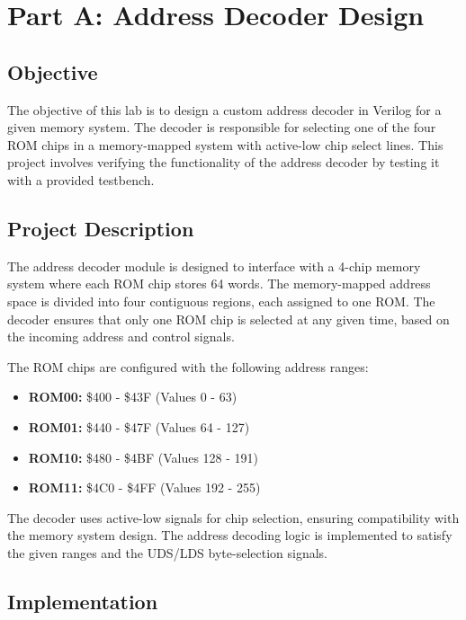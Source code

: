 \section{Part A: Address Decoder Design}

\subsection{Objective}
The objective of this lab is to design a custom address decoder in Verilog for a given memory system. The decoder is responsible for selecting one of the four ROM chips in a memory-mapped system with active-low chip select lines. This project involves verifying the functionality of the address decoder by testing it with a provided testbench.

\subsection{Project Description}
The address decoder module is designed to interface with a 4-chip memory system where each ROM chip stores 64 words. The memory-mapped address space is divided into four contiguous regions, each assigned to one ROM. The decoder ensures that only one ROM chip is selected at any given time, based on the incoming address and control signals.

The ROM chips are configured with the following address ranges:
\begin{itemize}
    \item \textbf{ROM00:} \$400 - \$43F (Values 0 - 63)
    \item \textbf{ROM01:} \$440 - \$47F (Values 64 - 127)
    \item \textbf{ROM10:} \$480 - \$4BF (Values 128 - 191)
    \item \textbf{ROM11:} \$4C0 - \$4FF (Values 192 - 255)
\end{itemize}

The decoder uses active-low signals for chip selection, ensuring compatibility with the memory system design. The address decoding logic is implemented to satisfy the given ranges and the UDS/LDS byte-selection signals.

\subsection{Implementation}

